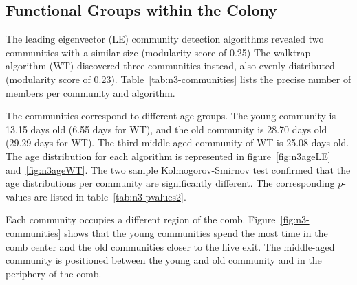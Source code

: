 \subsection{Functional Groups within the Colony}
The leading eigenvector (LE) community detection algorithms revealed two communities with a similar size (modularity score of 0.25) The walktrap algorithm (WT) discovered three communities instead, also evenly distributed (modularity score of 0.23). Table~\ref{tab:n3-communities} lists the precise number of members per community and algorithm.

The communities correspond to different age groups. The young community is 13.15 days old (6.55 days for WT), and the old community is 28.70 days old (29.29 days for WT). The third middle-aged community of WT is 25.08 days old. The age distribution for each algorithm is represented in figure~\ref{fig:n3ageLE} and~\ref{fig:n3ageWT}. The two sample Kolmogorov-Smirnov test confirmed that the age distributions per community are significantly different. The corresponding $p$-values are listed in table~\ref{tab:n3-pvalues2}.

Each community occupies a different region of the comb.
Figure~\ref{fig:n3-communities} shows that the young communities spend the most time in the comb center and the old communities closer to the hive exit. The middle-aged community is positioned between the young and old community and in the periphery of the comb.




